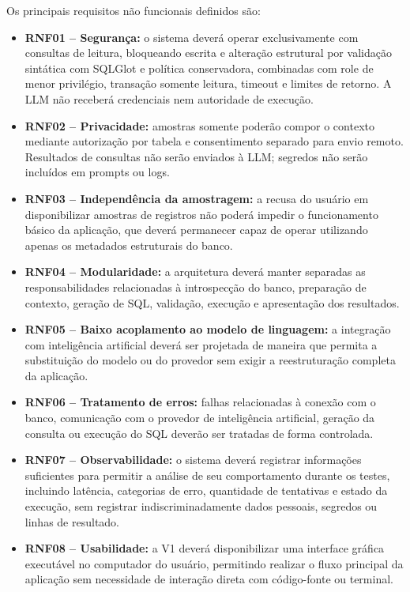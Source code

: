 Os principais requisitos não funcionais definidos são:

\begin{itemize}

    \item \textbf{RNF01 -- Segurança:}
    o sistema deverá operar exclusivamente com consultas de leitura, bloqueando escrita e alteração estrutural por validação sintática com SQLGlot e política conservadora, combinadas com role de menor privilégio, transação somente leitura, timeout e limites de retorno. A LLM não receberá credenciais nem autoridade de execução.

    \item \textbf{RNF02 -- Privacidade:}
    amostras somente poderão compor o contexto mediante autorização por tabela e consentimento separado para envio remoto. Resultados de consultas não serão enviados à LLM; segredos não serão incluídos em prompts ou logs.

    \item \textbf{RNF03 -- Independência da amostragem:}
    a recusa do usuário em disponibilizar amostras de registros não poderá impedir o funcionamento básico da aplicação, que deverá permanecer capaz de operar utilizando apenas os metadados estruturais do banco.

    \item \textbf{RNF04 -- Modularidade:}
    a arquitetura deverá manter separadas as responsabilidades relacionadas à introspecção do banco, preparação de contexto, geração de SQL, validação, execução e apresentação dos resultados.

    \item \textbf{RNF05 -- Baixo acoplamento ao modelo de linguagem:}
    a integração com inteligência artificial deverá ser projetada de maneira que permita a substituição do modelo ou do provedor sem exigir a reestruturação completa da aplicação.

    \item \textbf{RNF06 -- Tratamento de erros:}
    falhas relacionadas à conexão com o banco, comunicação com o provedor de inteligência artificial, geração da consulta ou execução do SQL deverão ser tratadas de forma controlada.

    \item \textbf{RNF07 -- Observabilidade:}
    o sistema deverá registrar informações suficientes para permitir a análise de seu comportamento durante os testes, incluindo latência, categorias de erro, quantidade de tentativas e estado da execução, sem registrar indiscriminadamente dados pessoais, segredos ou linhas de resultado.

    \item \textbf{RNF08 -- Usabilidade:}
    a V1 deverá disponibilizar uma interface gráfica executável no computador do usuário, permitindo realizar o fluxo principal da aplicação sem necessidade de interação direta com código-fonte ou terminal.

\end{itemize}

